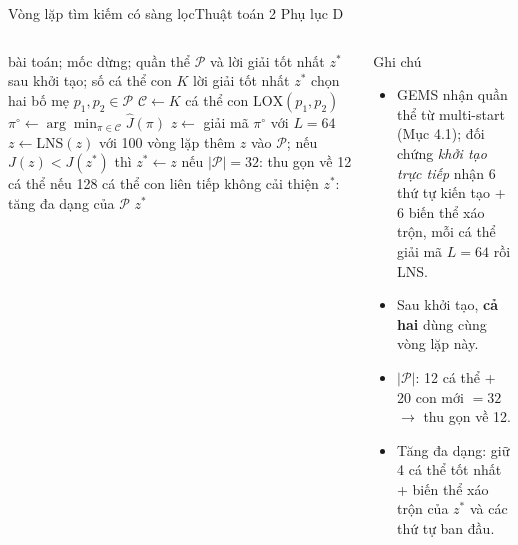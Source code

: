 \documentclass[aspectratio=169,10pt,t,xcolor={table}]{beamer}
\newcommand{\Jhat}{\widehat{J}}
\newcommand{\src}[1]{\hfill{\normalfont\footnotesize\color{white!62!navy}#1}}  %
\begin{document}
\begin{frame}{Vòng lặp tìm kiếm có sàng lọc\src{Thuật toán 2 \textperiodcentered{} Phụ lục D}}
\begin{columns}[T,onlytextwidth]
\setcounter{algorithm}{1}
\begin{algorithm}[H]
\caption{Vòng lặp tìm kiếm có sàng lọc trong GEMS}
\scriptsize
\begin{algorithmic}[1]
\Require bài toán; mốc dừng; quần thể $\mathcal P$ và lời giải tốt nhất $z^*$ sau khởi tạo; số cá thể con $K$
\Ensure lời giải tốt nhất $z^{*}$
\State chọn hai bố mẹ $p_1,p_2\in\mathcal{P}$
\State $\mathcal{C}\gets K$ cá thể con $\mathrm{LOX}(p_1,p_2)$ 
\State $\pi^{\circ}\gets\arg\min_{\pi\in\mathcal{C}}\Jhat(\pi)$ 
\State $z\gets$ giải mã $\pi^{\circ}$ với $L=64$
\State $z\gets\mathrm{LNS}(z)$ với 100 vòng lặp
\State thêm $z$ vào $\mathcal{P}$; nếu $J(z)<J(z^{*})$ thì $z^{*}\gets z$
\State nếu $|\mathcal{P}|=32$: thu gọn về 12 cá thể
\State nếu 128 cá thể con liên tiếp không cải thiện $z^{*}$: tăng đa dạng của $\mathcal{P}$
\EndWhile
\State \Return $z^{*}$
\end{algorithmic}
\end{algorithm}
\begin{block}{Ghi chú}
\scriptsize
\begin{itemize}
\item GEMS nhận quần thể từ multi-start (Mục 4.1); đối chứng \emph{khởi tạo trực tiếp} nhận 6 thứ tự kiến tạo + 6 biến thể xáo trộn, mỗi cá thể giải mã $L=64$ rồi LNS.
\item Sau khởi tạo, \textbf{cả hai} dùng cùng vòng lặp này.
\item $|\mathcal P|$: 12 cá thể + 20 con mới $=32$ $\to$ thu gọn về 12.
\item Tăng đa dạng: giữ 4 cá thể tốt nhất + biến thể xáo trộn của $z^*$ và các thứ tự ban đầu.
\end{itemize}
\end{block}
\end{columns}
\end{frame}
\end{document}
